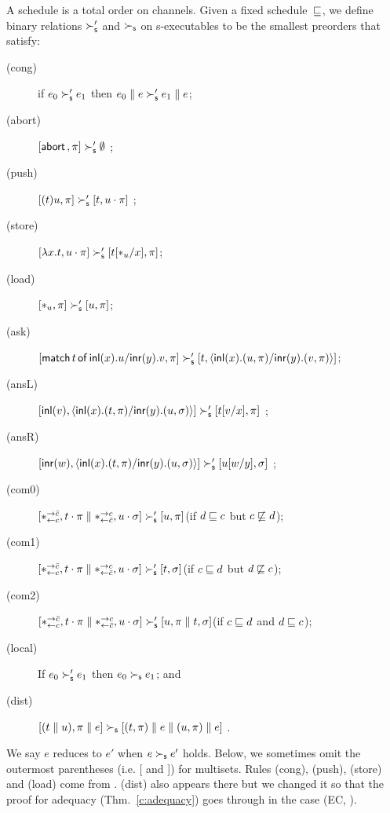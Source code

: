 \documentclass[envcountsame]{llncs}
\begin{document}
A schedule is a total order on channels.
Given a fixed schedule~$\sqsubseteq$,
we define binary relations $\succ_{\mathsf s}'$ and $\succ_{\mathsf s}$
on s-executables
to be the smallest preorders
that satisfy:
\begin{description}
 \item[(cong)] if
      $e_0         \succ_{\mathsf s}' e_1$
      then
      $e_0 \parallel e \succ_{\mathsf s}' e_1\parallel e$\enspace;
 \item[(abort)] $[\mathsf{abort\,},\pi]\succ_{\mathsf s}' \emptyset$ \enspace;
 \item[(push)]
	    $[(t)u,\pi]      \succ_{\mathsf s}' [t,u\cdot\pi]$      \enspace;
 \item[(store)]
	    $[\lambda x.t,u\cdot\pi]
	     \succ_{\mathsf s}'
	     [t[\ast_u/x],      \pi]$\enspace;
 \item[(load)]
	    $[\ast_u,\pi]\succ_{\mathsf s}' [u,\pi]$\enspace;
 \item[(ask)]
      $[\mathsf{match}\,{t}\,\mathsf{of}\, \mathsf{inl}({x}). {u}/ \mathsf{inr}({y}). {v},\pi]\succ_{\mathsf s}' [t,\langle \mathsf{inl}({x}). ({u},{\pi})/ \mathsf{inr}({y}). ({v},{\pi})\rangle]$\enspace;
 \item[(ansL)]
           $[\mathsf{inl}({v}), \langle \mathsf{inl}({x}). ({t},{\pi})/ \mathsf{inr}({y}). ({u},{\sigma})\rangle] \succ_{\mathsf s}' [t[v/x],\pi] $ \enspace;
 \item[(ansR)]
           $[\mathsf{inr}({w}), \langle \mathsf{inl}({x}). ({t},{\pi})/ \mathsf{inr}({y}). ({u},{\sigma})\rangle] \succ_{\mathsf s}' [u[w/y],\sigma] $ \enspace;
 \item[(com0)]
           $[\ast^{\rightarrow {\bar{c}}}_{\leftarrow{c}}, t\cdot\pi\parallel \ast^{\rightarrow {c}}_{\leftarrow{\bar{c}}},
           u\cdot\sigma] \succ_{\mathsf s}'
           [u,\pi]$\enspace(if $d\sqsubseteq c$ but $c\not\sqsubseteq d$)\enspace;
 \item[(com1)]
	    $[\ast^{\rightarrow {\bar{c}}}_{\leftarrow{c}}, t\cdot\pi\parallel \ast^{\rightarrow {c}}_{\leftarrow{\bar{c}}},
	    u\cdot\sigma] \succ_{\mathsf s}'
	    [t,\sigma]$\enspace(if $c\sqsubseteq d$ but $d\not\sqsubseteq c$)\enspace;
 \item[(com2)]
	    $[\ast^{\rightarrow {\bar{c}}}_{\leftarrow{c}}, t\cdot\pi\parallel \ast^{\rightarrow {c}}_{\leftarrow{\bar{c}}},
	    u\cdot\sigma] \succ_{\mathsf s}'
	    [u,\pi\parallel t,\sigma]$\enspace(if $c\sqsubseteq d$ and $d\sqsubseteq
       c$)\enspace;
 \item[(local)] If $e_0\succ_{\mathsf s}'e_1$ then $e_0\succ_{\mathsf s} e_1$\enspace; and
 \item[(dist)]
           $[(t\parallel u),\pi\parallel e]  \succ_{\mathsf s} [(t,\pi)\parallel e\parallel (u,\pi)\parallel
      e]$ \enspace.
\end{description}
We say $e$ reduces to $e'$ when $e\succ_{\mathsf s} e'$ holds.
Below, we sometimes omit the outermost parentheses (i.e. [ and ]) for multisets.
Rules (cong), (push), (store) and (load) come from
\citet{danos-krivine}.  (dist) also appears there but we changed it so
that the proof for adequacy (Thm.~\ref{c:adequacy}) goes through in the
case (EC, \textminus).
\end{document}
